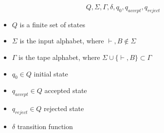     \begin{defn}
        \[Q,\Sigma, \Gamma,\delta,q_0,q_{accept},q_{reject}\]
        \begin{itemize}
            \item $Q$ is a finite set of states

            \item $\Sigma$ is the input alphabet, where $\vdash,B\notin \Sigma$

            \item $\Gamma$ is the tape alphabet, where $\Sigma\cup\{\vdash,B\}\subset\Gamma$

            \item $q_0\in Q$ initial state

            \item $q_{accept}\in Q$ accepted state

            \item $q_{reject}\in Q$ rejected state

            \item $\delta$ transition function
        \end{itemize}
    \end{defn}

